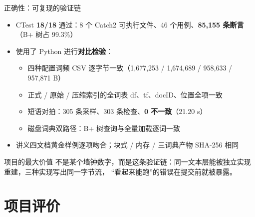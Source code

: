 \documentclass[UTF8,fontset=none,aspectratio=169,10pt]{ctexbeamer}
\newcommand{\key}[1]{\textcolor{accent}{\textbf{#1}}}
\newcommand{\src}[1]{\par\vspace{0.5em}{\fontsize{8}{9.6}\selectfont\color{gray}#1\par}}
\newcommand{\vsp}{\vspace*{\stretch{1}}}
\begin{document}
\begin{frame}{正确性：可复现的验证链}
  \normalsize
  \begin{itemize}\setlength{\itemsep}{0.5em}
    \item CTest \key{18/18} 通过：8 个 Catch2 可执行文件、46 个用例、\key{85,155 条断言}（B+ 树占 99.3\%）
    \item 使用了 Python 进行\key{对比检验}：
      \begin{itemize}\setlength{\itemsep}{0.2em}
        \item 四种配置词频 CSV 逐字节一致（1,677,253 / 1,674,689 / 958,633 / 957,871 B）
        \item 正式 / 原始 / 压缩索引的全词表 df、tf、docID、位置全项一致
        \item 短语对拍：305 条采样、303 条检查、\key{0 不一致}（21.20 s）
        \item 磁盘词典双路径：B+ 树查询与全量加载逐词一致
      \end{itemize}
    \item 讲义四文档黄金样例逐项吻合；块式 / 内存 / 三词典产物 SHA-256 相同
  \end{itemize}
  \vsp
  \begin{block}{项目的最大价值}
    \normalsize
    不是某个墙钟数字，而是这条验证链：同一文本层能被独立实现重建，三种实现写出同一字节流，
    ``看起来能跑''的错误在提交前就被暴露。
  \end{block}
\end{frame}

\section{项目评价}
\end{document}
